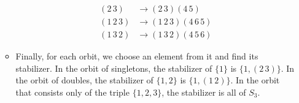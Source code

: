 \documentclass{article}
\begin{document}
\begin{enumerate}[itemsep=0em,label=(\alph*)]
\begin{itemize}[itemsep=0em]
\begin{align*}
                (2\,3) &\rightarrow (2\,3)(4\,5) \\
                (1\,2\,3) &\rightarrow (1\,2\,3)(4\,6\,5) \\
                (1\,3\,2) &\rightarrow (1\,3\,2)(4\,5\,6)
            \end{align*}
            \item Finally, for each orbit, we choose an element from it and find its stabilizer. In the orbit of singletons, the stabilizer of $\{ 1 \}$ is $\{ 1, (2\,3) \}$. In the orbit of doubles, the stabilizer of $\{ 1, 2 \}$ is $\{ 1, (1\,2) \}$. In the orbit that consists only of the triple $\{ 1, 2, 3 \}$, the stabilizer is all of $S_3$.
        \end{itemize}
\end{enumerate}
\end{document}
